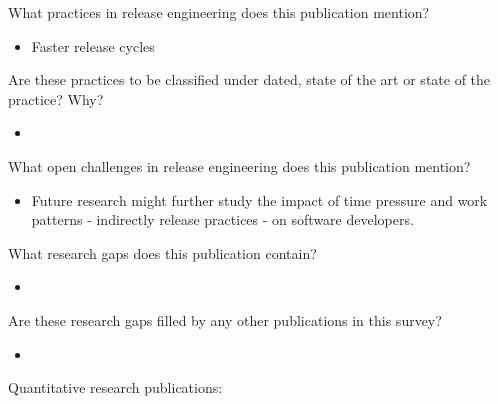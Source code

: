 \documentclass[]{book}
\providecommand{\tightlist}{%
  \setlength{\itemsep}{0pt}\setlength{\parskip}{0pt}}
\begin{document}
What practices in release engineering does this publication mention?

\begin{itemize}
\tightlist
\item
  Faster release cycles
\end{itemize}

Are these practices to be classified under dated, state of the art or
state of the practice? Why?

\begin{itemize}
\item
\end{itemize}

What open challenges in release engineering does this publication
mention?

\begin{itemize}
\tightlist
\item
  Future research might further study the impact of time pressure and
  work patterns - indirectly release practices - on software developers.
\end{itemize}

What research gaps does this publication contain?

\begin{itemize}
\item
\end{itemize}

Are these research gaps filled by any other publications in this survey?

\begin{itemize}
\item
\end{itemize}

Quantitative research publications:
\end{document}
